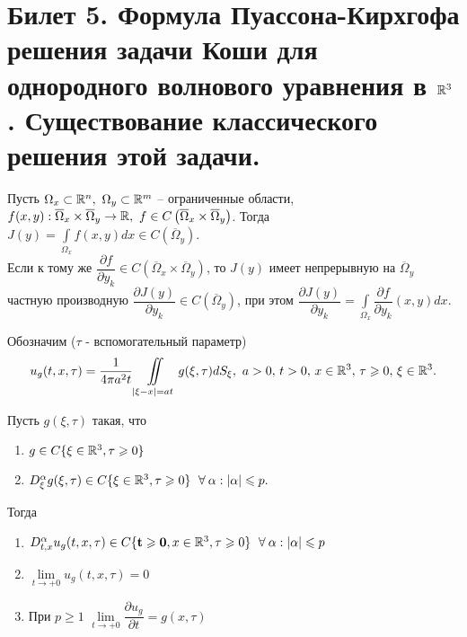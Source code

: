 \documentclass[../main.tex]{subfiles}
\begin{document}
\section{Билет 5. Формула Пуассона-Кирхгофа решения задачи Коши для однородного волнового уравнения в \texorpdfstring{$\mathbb{R}^3$}{R\textasciicircum 3}. Существование классического решения этой задачи.}
\begin{theorem}
Пусть $\Omega_x\subset\R^n,\ \Omega_y\subset\R^m$ -- ограниченные области, $f(x,y):\overline{\Omega}_x\times\overline{\Omega}_y\rightarrow \mathbb{R},\ f\in C\left(\overline{\Omega}_x\times\overline{\Omega}_y \right)$. Тогда $J(y)=\displaystyle\int\limits_{\Omega_x}f(x,y)dx\in C\left(\overline{\Omega}_y \right)$.\\
Если к тому же $\dfrac{\partial f}{\partial y_k}\in C\left(\overline{\Omega}_x\times\overline{\Omega}_y \right)$, то $J(y)$ имеет непрерывную на $\overline{\Omega}_y$ частную производную $\dfrac{\partial J(y)}{\partial y_k}\in C\left(\overline{\Omega}_y \right)$, при этом $\dfrac{\partial J(y)}{\partial y_k}=\displaystyle\int\limits_{\Omega_x}\dfrac{\partial f}{\partial y_k}(x,y)dx$.
\end{theorem}
Обозначим ($\tau$ - вспомогательный параметр)
\[
u_g(t,x,\tau)=\frac{1}{4\pi a^2t}\displaystyle\iint\limits_{|\xi - x|=at}g(\xi ,\tau ) dS_{\xi},\ a>0,\, t> 0,\, x\in \R^3,\, \tau \geq 0,\, \xi\in\R^3.
\]
\begin{lemma}
Пусть $g(\xi, \tau )$ такая, что 
\begin{enumerate}
\item $g \in C\{\xi\in\mathbb{R}^3,\tau\geqslant 0 \}$
\item $D_{\xi}^{\alpha}g(\xi , \tau )\in C\{\xi\in\R^3,\tau\geq 0 \}\ \forall\alpha : |\alpha |\leq p.$
\end{enumerate}
Тогда
\begin{enumerate}
\item $D_{t,x}^{\alpha}u_g(t,x,\tau )\in C\{\mathbf{t\geq 0}, x\in\R^3,\tau\geq 0 \}\ \forall\alpha : |\alpha |\leq p$
\item $\lim\limits_{t\rightarrow +0}u_g(t,x,\tau )=0$
\item При $p\geq 1$ $\lim\limits_{t\rightarrow +0}\dfrac{\partial u_g}{\partial t}=g(x,\tau)$
\end{enumerate}
\end{lemma}
\end{document}
